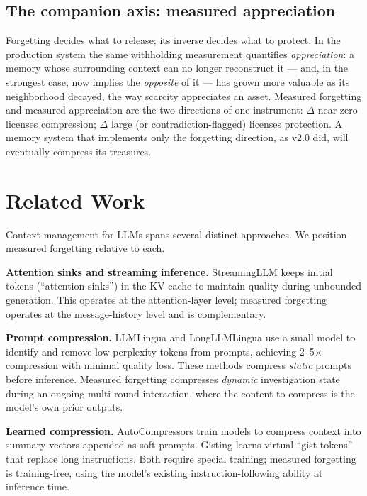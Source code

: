 \documentclass[11pt,a4paper]{article}
\begin{document}
\subsection{The companion axis: measured appreciation}

Forgetting decides what to release; its inverse decides what to protect. In the production system the same withholding measurement quantifies \emph{appreciation}: a memory whose surrounding context can no longer reconstruct it --- and, in the strongest case, now implies the \emph{opposite} of it --- has grown more valuable as its neighborhood decayed, the way scarcity appreciates an asset. Measured forgetting and measured appreciation are the two directions of one instrument: $\Delta$ near zero licenses compression; $\Delta$ large (or contradiction-flagged) licenses protection. A memory system that implements only the forgetting direction, as v2.0 did, will eventually compress its treasures.

\section{Related Work}

Context management for LLMs spans several distinct approaches. We position measured forgetting relative to each.

\textbf{Attention sinks and streaming inference.} StreamingLLM \cite{xiao2023streaming} keeps initial tokens (``attention sinks'') in the KV cache to maintain quality during unbounded generation. This operates at the attention-layer level; measured forgetting operates at the message-history level and is complementary.

\textbf{Prompt compression.} LLMLingua \cite{jiang2023llmlingua} and LongLLMLingua \cite{jiang2024longllmlingua} use a small model to identify and remove low-perplexity tokens from prompts, achieving 2--5$\times$ compression with minimal quality loss. These methods compress \emph{static} prompts before inference. Measured forgetting compresses \emph{dynamic} investigation state during an ongoing multi-round interaction, where the content to compress is the model's own prior outputs.

\textbf{Learned compression.} AutoCompressors \cite{chevalier2023autocompressors} train models to compress context into summary vectors appended as soft prompts. Gisting \cite{mu2024gisting} learns virtual ``gist tokens'' that replace long instructions. Both require special training; measured forgetting is training-free, using the model's existing instruction-following ability at inference time.
\end{document}
